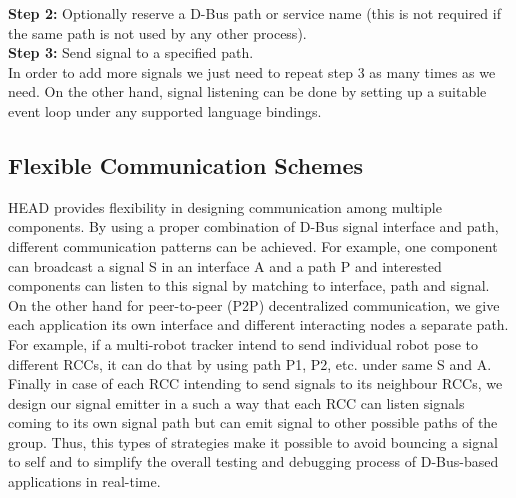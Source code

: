 \documentclass{ifacconf}
\begin{document}
\textbf{Step 2:} Optionally reserve a D-Bus path or service name (this is not required if the same path is not used by any other process).\\
\textbf{Step 3:} Send signal to a specified path. \\
In order to add more signals we just need to repeat step 3 as many times as we need. On the other hand, signal listening can be done by setting up a suitable event loop under any supported language bindings.
\subsection{Flexible Communication  Schemes}
HEAD provides flexibility in designing communication among multiple components. By using a proper combination of D-Bus signal interface and path, different communication patterns can be achieved. For example, one component can broadcast a signal S in an interface A and a path P and interested components can listen to this signal by matching to interface, path and signal. On the other hand for peer-to-peer (P2P) decentralized communication,  we give each application its own interface and different interacting nodes a separate path.  For example, if a multi-robot tracker intend to send individual robot pose to different RCCs, it can do that by using path P1,  P2, etc. under same S and A. Finally in case of each RCC intending to send signals to its neighbour RCCs, we design our signal emitter in a such a way that each RCC can listen signals coming to its own signal path but can emit  signal to other possible paths of the group. Thus,  this types of strategies  make it possible to avoid bouncing a signal to self and to simplify the overall testing and debugging process of D-Bus-based applications in real-time. 
\end{document}
